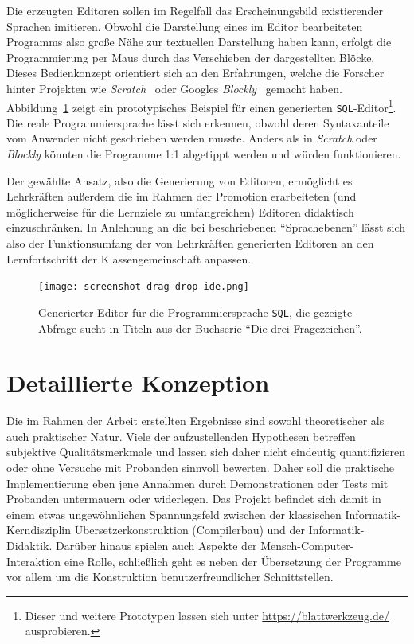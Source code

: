 \documentclass[paper=a4,fontsize=11pt,parskip=half]{scrartcl}
\begin{document}
Die erzeugten Editoren sollen im Regelfall das Erscheinungsbild existierender Sprachen imitieren. Obwohl die Darstellung eines im Editor bearbeiteten Programms also große Nähe zur textuellen Darstellung haben kann, erfolgt die Programmierung per Maus durch das Verschieben der dargestellten Blöcke. Dieses Bedienkonzept orientiert sich an den Erfahrungen, welche die Forscher hinter Projekten wie \textit{Scratch}~\cite{maloney_scratch:_2004} oder Googles \textit{Blockly}~\cite{fraser_ten_2015} gemacht haben. Abbildung~\ref{fig:example-sql-ide} zeigt ein prototypisches Beispiel für einen generierten \texttt{SQL}-Editor\footnote{Dieser und weitere Prototypen lassen sich unter \url{https://blattwerkzeug.de/} ausprobieren.}. Die reale Programmiersprache lässt sich erkennen, obwohl deren Syntaxanteile vom Anwender nicht geschrieben werden musste. Anders als in \textit{Scratch} oder \textit{Blockly} könnten die Programme 1:1 abgetippt werden und würden funktionieren.

Der gewählte Ansatz, also die Generierung von Editoren, ermöglicht es Lehrkräften außerdem die im Rahmen der Promotion erarbeiteten (und möglicherweise für die Lernziele zu umfangreichen) Editoren didaktisch einzuschränken. In Anlehnung an die bei \cite{klaeren_macht_2007} beschriebenen \enquote{Sprachebenen} lässt sich also der Funktionsumfang der von Lehrkräften generierten Editoren an den Lernfortschritt der Klassengemeinschaft anpassen.

\begin{figure}[h]
  \centering\texttt{[image: screenshot-drag-drop-ide.png]}
  \caption{Generierter Editor für die Programmiersprache \texttt{SQL}, die gezeigte Abfrage sucht in Titeln aus der Buchserie \enquote{Die drei Fragezeichen}.}
  \label{fig:example-sql-ide}
\end{figure}

\clearpage

\restoregeometry
\pagestyle{plain}

\section{Detaillierte Konzeption}

Die im Rahmen der Arbeit erstellten Ergebnisse sind sowohl theoretischer als auch praktischer Natur. Viele der aufzustellenden Hypothesen betreffen subjektive Qualitätsmerkmale und lassen sich daher nicht eindeutig quantifizieren oder ohne Versuche mit Probanden sinnvoll bewerten. Daher soll die praktische Implementierung eben jene Annahmen durch Demonstrationen oder Tests mit Probanden untermauern oder widerlegen. Das Projekt befindet sich damit in einem etwas ungewöhnlichen Spannungsfeld zwischen der klassischen Informatik-Kerndisziplin Übersetzerkonstruktion (Compilerbau) und der Informatik-Didaktik. Darüber hinaus spielen auch Aspekte der Mensch-Computer-Interaktion eine Rolle, schließlich geht es neben der Übersetzung der Programme vor allem um die Konstruktion benutzerfreundlicher Schnittstellen.
\end{document}
